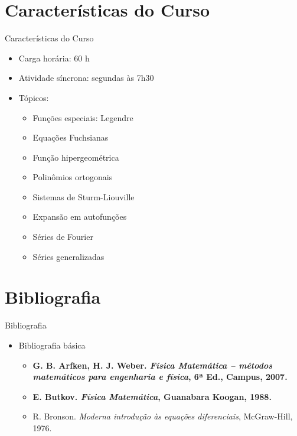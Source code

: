    \section[ slide = true ]{Características do Curso}
      \begin{slide}[toc=]{Características do Curso}
         \begin{itemize}
            \item Carga horária: 60 h
            \item Atividade síncrona: segundas às 7h30
            \item Tópicos:
            \begin{itemize}
               \item Funções especiais: Legendre
               \item Equações Fuchsianas
               \item Função hipergeométrica
               \item Polinômios ortogonais
	       \item Sistemas de Sturm-Liouville
               \item Expansão em autofunções
               \item Séries de Fourier
	       \item Séries generalizadas
            \end{itemize}
         \end{itemize}         
      \end{slide}
      
   \section[ slide = true ]{Bibliografia}
      \begin{slide}[toc=]{Bibliografia}
         \begin{itemize}
            \item Bibliografia básica
            \begin{itemize}
               \item \textbf{G. B. Arfken, H. J. Weber. \emph{Física Matemática -- métodos matemáticos para engenharia e física}, 6ª Ed., Campus, 2007.}
               \item \textbf{E. Butkov. \emph{Física Matemática}, Guanabara Koogan, 1988.}
               \item {R. Bronson. \emph{Moderna introdução às equações diferenciais}, McGraw-Hill, 1976.}
            \end{itemize}
         \end{itemize}
      \end{slide}

